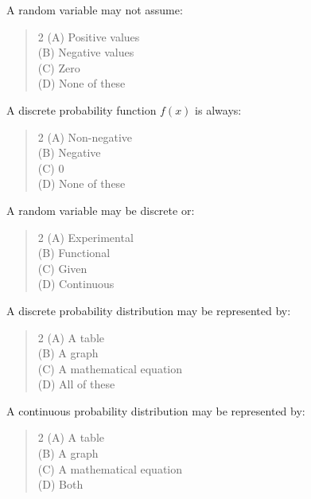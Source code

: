 \documentclass[11pt,a4paper]{article}
\begin{document}
\begin{mcqlist}
\item A random variable may not assume:
\begin{quote}\begin{multicols}{2}
\noindent (A) Positive values \\
(B) Negative values \\
(C) Zero \\
(D) None of these
\end{multicols}\end{quote}

\item A discrete probability function $f(x)$ is always:
\begin{quote}\begin{multicols}{2}
\noindent (A) Non-negative \\
(B) Negative \\
(C) $0$ \\
(D) None of these
\end{multicols}\end{quote}

\item A random variable may be discrete or:
\begin{quote}\begin{multicols}{2}
\noindent (A) Experimental \\
(B) Functional \\
(C) Given \\
(D) Continuous
\end{multicols}\end{quote}

\item A discrete probability distribution may be represented by:
\begin{quote}\begin{multicols}{2}
\noindent (A) A table \\
(B) A graph \\
(C) A mathematical equation \\
(D) All of these
\end{multicols}\end{quote}

\item A continuous probability distribution may be represented by:
\begin{quote}\begin{multicols}{2}
\noindent (A) A table \\
(B) A graph \\
(C) A mathematical equation \\
(D) Both
\end{multicols}\end{quote}


\end{mcqlist}
\end{document}
